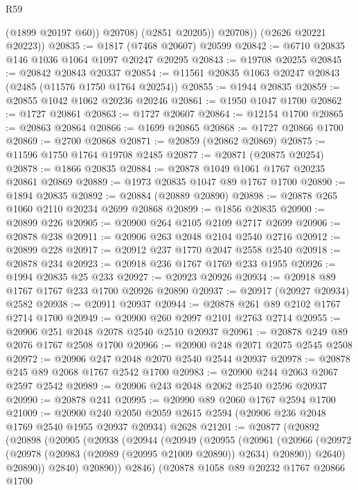 \begin{lexlean}{R59}
\begin{coremodule}
                (@1899 @20197 @60))
              @20708)
            (@2851 @20205))
          @20708))
      (@2626 @20221 @20223))
@20835 := @1817 (@7468 @20607) @20599
@20842 := @6710 @20835 @146 @1036 @1064 @1097 @20247 @20295
@20843 := @19708 @20255
@20845 := @20842 @20843 @20337
@20854 := @11561 @20835 @1063 @20247 @20843 (@2485 (@11576 @1750 @1764 @20254))
@20855 := @1944 @20835
@20859 := @20855 @1042 @1062 @20236 @20246
@20861 := @1950 @1047 @1700
@20862 := @1727 @20861
@20863 := @1727 @20607
@20864 := @12154 @1700
@20865 := @20863 @20864
@20866 := @1699 @20865
@20868 := @1727 @20866 @1700
@20869 := @2700 @20868
@20871 := @20859 (@20862 @20869)
@20875 := @11596 @1750 @1764 @19708 @2485
@20877 := @20871 (@20875 @20254)
@20878 := @1866 @20835
@20884 := @20878 @1049 @1061 @1767 @20235 @20861 @20869
@20889 := @1973 @20835 @1047 @89 @1767 @1700
@20890 := @1894 @20835
@20892 := @20884 (@20889 @20890)
@20898 := @20878 @265 @1060 @2110 @20234 @2699 @20868
@20899 := @1856 @20835
@20900 := @20899 @226
@20905 := @20900 @264 @2105 @2109 @2717 @2699
@20906 := @20878 @238
@20911 := @20906 @263 @2048 @2104 @2540 @2716
@20912 := @20899 @228
@20917 := @20912 @237 @1770 @2047 @2558 @2540
@20918 := @20878 @234
@20923 := @20918 @236 @1767 @1769 @233 @1955
@20926 := @1994 @20835 @25 @233
@20927 := @20923 @20926
@20934 := @20918 @89 @1767 @1767 @233 @1700 @20926 @20890
@20937 := @20917 (@20927 @20934) @2582
@20938 := @20911 @20937
@20944 := @20878 @261 @89 @2102 @1767 @2714 @1700
@20949 := @20900 @260 @2097 @2101 @2763 @2714
@20955 := @20906 @251 @2048 @2078 @2540 @2510 @20937
@20961 := @20878 @249 @89 @2076 @1767 @2508 @1700
@20966 := @20900 @248 @2071 @2075 @2545 @2508
@20972 := @20906 @247 @2048 @2070 @2540 @2544 @20937
@20978 := @20878 @245 @89 @2068 @1767 @2542 @1700
@20983 := @20900 @244 @2063 @2067 @2597 @2542
@20989 := @20906 @243 @2048 @2062 @2540 @2596 @20937
@20990 := @20878 @241
@20995 := @20990 @89 @2060 @1767 @2594 @1700
@21009 := @20900
    @240
    @2050
    @2059
    @2615
    @2594
    (@20906 @236 @2048 @1769 @2540 @1955 @20937 @20934)
    @2628
@21201 := @20877
    (@20892
      (@20898
        (@20905
          (@20938
            (@20944
              (@20949
                (@20955
                  (@20961
                    (@20966
                      (@20972 (@20978 (@20983 (@20989 (@20995 @21009 @20890)) @2634) @20890))
                      @2640)
                    @20890))
                @2840)
              @20890))
          @2846)
        (@20878
          @1058
          @89
          @20232
          @1767
          @20866
          @1700

\end{coremodule}
\end{lexlean}
